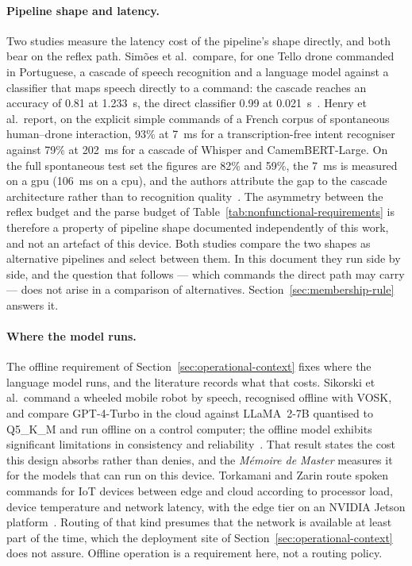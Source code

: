 \paragraph{Pipeline shape and latency.} Two studies measure the latency cost of the pipeline's
shape directly, and both bear on the reflex path. Sim\~oes et al.\ compare, for one Tello drone
commanded in Portuguese, a cascade of speech recognition and a language model against a classifier
that maps speech directly to a command: the cascade reaches an accuracy of 0.81 at 1.233~s, the
direct classifier 0.99 at 0.021~s~\cite{simoes2024}. Henry et al.\ report, on the explicit simple
commands of a French corpus of spontaneous human--drone interaction, 93\% at 7~ms for a
transcription-free intent recogniser against 79\% at 202~ms for a cascade of Whisper and
CamemBERT-Large. On the full spontaneous test set the figures are 82\% and 59\%, the 7~ms is
measured on a \gls{gpu} (106~ms on a \gls{cpu}), and the authors attribute the gap to the cascade
architecture rather than to recognition quality~\cite{henry2026}. The asymmetry between the reflex
budget and the parse budget of Table~\ref{tab:nonfunctional-requirements} is therefore a property of
pipeline shape documented independently of this work, and not an artefact of this device. Both
studies compare the two shapes as alternative pipelines and select between them. In this document
they run side by side, and the question that follows --- which commands the direct path may carry
--- does not arise in a comparison of alternatives. Section~\ref{sec:membership-rule} answers it.

\paragraph{Where the model runs.} The offline requirement of Section~\ref{sec:operational-context}
fixes where the language model runs, and the literature records what that costs. Sikorski et al.\
command a wheeled mobile robot by speech, recognised offline with VOSK, and compare GPT-4-Turbo in
the cloud against LLaMA~2-7B quantised to Q5\_K\_M and run offline on a control computer; the
offline model exhibits significant limitations in consistency and reliability~\cite{sikorski2025}.
That result states the cost this design absorbs rather than denies, and the \emph{M\'emoire de
Master} measures it for the models that can run on this device. Torkamani and Zarin route spoken
commands for IoT devices between edge and cloud according to processor load, device temperature and
network latency, with the edge tier on an NVIDIA Jetson platform~\cite{torkamani2025}. Routing of
that kind presumes that the network is available at least part of the time, which the deployment
site of Section~\ref{sec:operational-context} does not assure. Offline operation is a requirement
here, not a routing policy.

